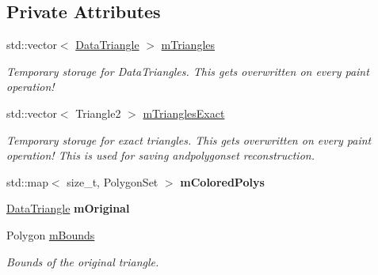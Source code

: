 \subsection*{Private Attributes}
\begin{DoxyCompactItemize}
\item 
\mbox{\label{classpepr3d_1_1_triangle_detail_a4739e317a83230e718680cabf62a4e59}} 
std\+::vector$<$ \mbox{\hyperlink{classpepr3d_1_1_data_triangle}{Data\+Triangle}} $>$ \mbox{\hyperlink{classpepr3d_1_1_triangle_detail_a4739e317a83230e718680cabf62a4e59}{m\+Triangles}}
\begin{DoxyCompactList}\small\item\em Temporary storage for Data\+Triangles. This gets overwritten on every paint operation! \end{DoxyCompactList}\item 
\mbox{\label{classpepr3d_1_1_triangle_detail_a54dc3ac5cbda466f72e444360625cd83}} 
std\+::vector$<$ Triangle2 $>$ \mbox{\hyperlink{classpepr3d_1_1_triangle_detail_a54dc3ac5cbda466f72e444360625cd83}{m\+Triangles\+Exact}}
\begin{DoxyCompactList}\small\item\em Temporary storage for exact triangles. This gets overwritten on every paint operation! This is used for saving andpolygonset reconstruction. \end{DoxyCompactList}\item 
\mbox{\label{classpepr3d_1_1_triangle_detail_a93dde966f3762bad3f47b0932bbcc70a}} 
std\+::map$<$ size\+\_\+t, Polygon\+Set $>$ {\bfseries m\+Colored\+Polys}
\item 
\mbox{\label{classpepr3d_1_1_triangle_detail_a4c6c24850c358f6a553b78b1460338fe}} 
\mbox{\hyperlink{classpepr3d_1_1_data_triangle}{Data\+Triangle}} {\bfseries m\+Original}
\item 
\mbox{\label{classpepr3d_1_1_triangle_detail_a80df9f3e1d10aafc8d6136490f332c5f}} 
Polygon \mbox{\hyperlink{classpepr3d_1_1_triangle_detail_a80df9f3e1d10aafc8d6136490f332c5f}{m\+Bounds}}
\begin{DoxyCompactList}\small\item\em Bounds of the original triangle. \end{DoxyCompactList}\item 

\end{DoxyCompactItemize}
